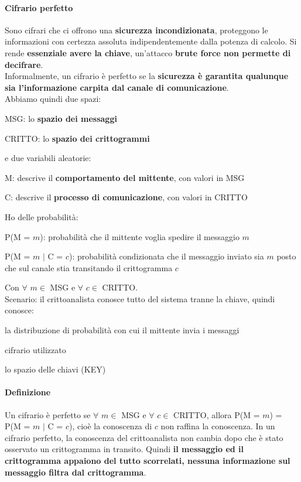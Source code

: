 \documentclass[10pt]{book}
\begin{document}
\paragraph{Cifrario perfetto} Sono cifrari che ci offrono una \textbf{sicurezza incondizionata}, proteggono le informazioni con certezza assoluta indipendentemente dalla potenza di calcolo. Si rende \textbf{essenziale avere la chiave}, un'attacco \textbf{brute force non permette di decifrare}.\\
Informalmente, un cifrario è perfetto se la \textbf{sicurezza è garantita qualunque sia l'informazione carpita dal canale di comunicazione}.\\
Abbiamo quindi due spazi:
\begin{list}{}{}
	\item MSG: lo \textbf{spazio dei messaggi}
	\item CRITTO: lo \textbf{spazio dei crittogrammi}
\end{list}
e due variabili aleatorie:
\begin{list}{}{}
	\item M: descrive il \textbf{comportamento del mittente}, con valori in MSG
	\item C: descrive il \textbf{processo di comunicazione}, con valori in CRITTO
\end{list}
Ho delle probabilità:
\begin{list}{}{}
	\item P(M = $m$): probabilità che il mittente voglia spedire il messaggio $m$
	\item P(M = $m$ $|$ C = $c$): probabilità condizionata che il messaggio inviato sia $m$ posto che sul canale stia transitando il crittogramma $c$
\end{list}
Con $\forall$ $m\in$ MSG e $\forall$ $c\in$ CRITTO.\\
Scenario: il crittoanalista conosce tutto del sistema tranne la chiave, quindi conosce:
\begin{list}{}{}
	\item la distribuzione di probabilità con cui il mittente invia i messaggi
	\item cifrario utilizzato
	\item lo spazio delle chiavi (KEY)
\end{list}
\paragraph{Definizione} Un cifrario è perfetto se $\forall$ $m\in$ MSG e $\forall$ $c\in$ CRITTO, allora P(M = $m$) = P(M = $m$ $|$ C = $c$), cioè la conoscenza di $c$ non raffina la conoscenza.
In un cifrario perfetto, la conoscenza del crittoanalista non cambia dopo che è stato osservato un crittogramma in transito. Quindi \textbf{il messaggio ed il crittogramma appaiono del tutto scorrelati, nessuna informazione sul messaggio filtra dal crittogramma}.
\end{document}
